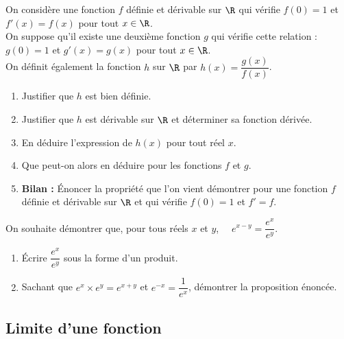 \documentclass[a4paper,11pt,exos]{nsi} %
\begin{document}
On considère une fonction $f$ définie et dérivable sur $\R$ qui vérifie $f(0)=1$ et $f'(x)=f(x)$ pour tout $x\in\R$.\\
On suppose qu'il existe une deuxième fonction $g$ qui vérifie cette relation : $g(0)=1$ et $g'(x)=g(x)$ pour tout $x\in\R$.\\
On définit également la fonction $h$ sur $\R$ par $h(x)=\dfrac{g(x)}{f(x)}$.
\begin{enumerate}
	\item 	Justifier que $h$ est bien définie.
	\item 	Justifier que $h$ est dérivable sur $\R$ et déterminer sa fonction dérivée.
	\item	En déduire l'expression de $h(x)$ pour tout réel $x$.
	\item	Que peut-on alors en déduire pour les fonctions $f$ et $g$.
	\item	\textbf{Bilan :} \'Enoncer la propriété que l'on vient démontrer pour une fonction $f$ définie et dérivable sur $\R$ et qui vérifie $f(0)=1$ et $f'=f$.
\end{enumerate}



\exo{}
On souhaite démontrer que, pour tous réels $x$ et $y$, $\quad e^{x-y}=\dfrac{e^x}{e^y}$.
\begin{enumerate}
	\item 	\'Ecrire $\dfrac{e^x}{e^y}$ sous la forme d'un produit.
	\item 	Sachant que $e^x\times e^y=e^{x+y}$ et $e^{-x}=\dfrac{1}{e^x}$, démontrer la proposition énoncée.
\end{enumerate}

\subsection*{Limite d'une fonction}
\end{document}
